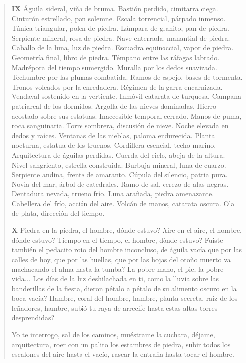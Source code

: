 \documentclass[12pt]{article}
\begin{document}
\begin{verse}
\textbf{ IX}
Águila sideral, viña de bruma.  
Bastión perdido, cimitarra ciega.  
Cinturón estrellado, pan solemne.  
Escala torrencial, párpado inmenso.  
Túnica triangular, polen de piedra.  
Lámpara de granito, pan de piedra.  
Serpiente mineral, rosa de piedra.  
Nave enterrada, manantial de piedra.  
Caballo de la luna, luz de piedra.  
Escuadra equinoccial, vapor de piedra.  
Geometría final, libro de piedra.  
Témpano entre las ráfagas labrado.  
Madrépora del tiempo sumergido.  
Muralla por los dedos suavizada.  
Techumbre por las plumas combatida.  
Ramos de espejo, bases de tormenta.  
Tronos volcados por la enredadera.  
Régimen de la garra encarnizada.  
Vendaval sostenido en la vertiente.  
Inmóvil catarata de turquesa.  
Campana patriarcal de los dormidos.  
Argolla de las nieves dominadas.  
Hierro acostado sobre sus estatuas.  
Inaccesible temporal cerrado.  
Manos de puma, roca sanguinaria.  
Torre sombrera, discusión de nieve.  
Noche elevada en dedos y raíces.  
Ventanas de las nieblas, paloma endurecida.  
Planta nocturna, estatua de los truenos.  
Cordillera esencial, techo marino.  
Arquitectura de águilas perdidas.  
Cuerda del cielo, abeja de la altura.  
Nivel sangriento, estrella construida.  
Burbuja mineral, luna de cuarzo.  
Serpiente andina, frente de amaranto.  
Cúpula del silencio, patria pura.  
Novia del mar, árbol de catedrales.  
Ramo de sal, cerezo de alas negras.  
Dentadura nevada, trueno frío.  
Luna arañada, piedra amenazante.  
Cabellera del frío, acción del aire.  
Volcán de manos, catarata oscura.  
Ola de plata, dirección del tiempo.  

\textbf{ X}
Piedra en la piedra, el hombre, dónde estuvo?  
Aire en el aire, el hombre, dónde estuvo?  
Tiempo en el tiempo, el hombre, dónde estuvo?  
Fuiste también el pedacito roto  
del hombre inconcluso, de águila vacía  
que por las calles de hoy, que por las huellas,  
que por las hojas del otoño muerto  
va machacando el alma hasta la tumba?  
La pobre mano, el pie, la pobre vida...  
Los días de la luz deshilachada  
en ti, como la lluvia  
sobre las banderillas de la fiesta,  
dieron pétalo a pétalo de su alimento oscuro  
en la boca vacía?  
	 Hambre, coral del hombre,  
hambre, planta secreta, raíz de los leñadores,  
hambre, subió tu raya de arrecife  
hasta estas altas torres desprendidas?  
	
Yo te interrogo, sal de los caminos,  
muéstrame la cuchara, déjame, arquitectura,  
roer con un palito los estambres de piedra,  
subir todos los escalones del aire hasta el vacío,  
rascar la entraña hasta tocar el hombre.  
	

\end{verse}
\end{document}

